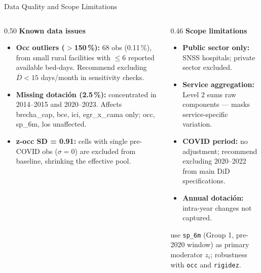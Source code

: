 \documentclass[aspectratio=169]{beamer}
\begin{document}
\begin{frame}{Data Quality and Scope Limitations}
  \begin{columns}[T]
    \begin{column}{0.50\textwidth}
      \textbf{Known data issues}
      \begin{itemize}\scriptsize\setlength{\itemsep}{3pt}
        \item \textbf{Occ outliers ($>$150\,\%):} 68 obs (0.11\,\%), from small rural
              facilities with $\le6$ reported available bed-days. Recommend excluding
              $\overline{D}<15$ days/month in sensitivity checks.
        \item \textbf{Missing dotaci\'on (2.5\,\%):} concentrated in 2014--2015 and
              2020--2023. Affects brecha\_cap, bce, ici, egr\_x\_cama only;
              occ, sp\_6m, los unaffected.
        \item \textbf{z-occ SD = 0.91:} cells with single pre-COVID obs
              ($\sigma=0$) are excluded from baseline, shrinking the effective pool.
      \end{itemize}
    \end{column}
    \begin{column}{0.46\textwidth}
      \textbf{Scope limitations}
      \begin{itemize}\scriptsize\setlength{\itemsep}{3pt}
        \item \textbf{Public sector only:} SNSS hospitals; private sector excluded.
        \item \textbf{Service aggregation:} Level 2 sums raw components ---
              masks service-specific variation.
        \item \textbf{COVID period:} no adjustment; recommend excluding 2020--2022
              from main DiD specifications.
        \item \textbf{Annual dotaci\'on:} intra-year changes not captured.
      \end{itemize}
      \smallskip
      \begin{keybox}
        \scriptsize
         use \texttt{sp\_6m} (Group 1, pre-2020 window)
        as primary moderator $z_i$; robustness with \texttt{occ} and
        \texttt{rigidez}.
      \end{keybox}
    \end{column}
  \end{columns}
\end{frame}

\end{document}
